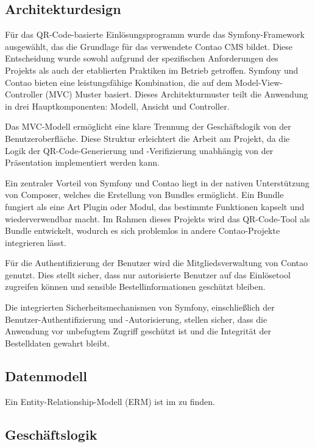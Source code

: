 \subsection{Architekturdesign}
\label{sec:Architekturdesign}

Für das QR-Code-basierte Einlösungsprogramm wurde das Symfony-Framework ausgewählt, das die Grundlage für das verwendete Contao CMS bildet. Diese Entscheidung wurde sowohl aufgrund der spezifischen Anforderungen des Projekts als auch der etablierten Praktiken im Betrieb getroffen. Symfony und Contao bieten eine leistungsfähige Kombination, die auf dem Model-View-Controller (\acs{MVC}) Muster basiert. Dieses Architekturmuster teilt die Anwendung in drei Hauptkomponenten: Modell, Ansicht und Controller.

Das MVC-Modell ermöglicht eine klare Trennung der Geschäftslogik von der Benutzeroberfläche. Diese Struktur erleichtert die Arbeit am Projekt, da die Logik der QR-Code-Generierung und -Verifizierung unabhängig von der Präsentation implementiert werden kann.

Ein zentraler Vorteil von Symfony und Contao liegt in der nativen Unterstützung von Composer, welches die Erstellung von Bundles ermöglicht. Ein Bundle fungiert als eine Art Plugin oder Modul, das bestimmte Funktionen kapselt und wiederverwendbar macht. Im Rahmen dieses Projekts wird das QR-Code-Tool als Bundle entwickelt, wodurch es sich problemlos in andere Contao-Projekte integrieren lässt.

Für die Authentifizierung der Benutzer wird die Mitgliedsverwaltung von Contao genutzt. Dies stellt sicher, dass nur autorisierte Benutzer auf das Einlösetool zugreifen können und sensible Bestellinformationen geschützt bleiben.

Die integrierten Sicherheitsmechanismen von Symfony, einschließlich der Benutzer-Authentifizierung und -Autorisierung, stellen sicher, dass die Anwendung vor unbefugtem Zugriff geschützt ist und die Integrität der Bestelldaten gewahrt bleibt.


\subsection{Datenmodell}
\label{sec:Datenmodell}

Ein Entity-Relationship-Modell (ERM) ist im  zu finden.

\subsection{Geschäftslogik}
\label{sec:Geschaeftslogik}

